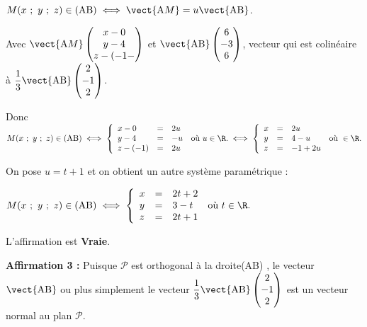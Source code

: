$M(x~;~y~;~z) \in (\text{AB}) \iff \vect{\text{A}M} = u\vect{\text{AB}}$.

Avec $\vect{\text{A}M}\begin{pmatrix}x - 0\\y - 4\\z - (-1-\end{pmatrix}$ et $\vect{\text{AB}}\begin{pmatrix}6\\-3\\6\end{pmatrix}$, vecteur qui est colinéaire à $\dfrac13\vect{\text{AB}}\begin{pmatrix}2\\-1\\2\end{pmatrix}$.

Donc $M(x~;~y~;~z) \in (\text{AB}) \iff \left\{\begin{array}{l c l}
x - 0&=& 2u\\
y - 4&=&  - u\\
z - (-1)&=&2u
\end{array}\right. \:\text{où } u \in \R. \iff \left\{\begin{array}{l c l}
x &=& 2u\\
y &=&4  - u\\
z &=&- 1 + 2u
\end{array}\right. \:\text{où } \in \R.$

On pose $u = t + 1$ et on obtient un autre système paramétrique :

$M(x~;~y~;~z) \in (\text{AB}) \iff \left\{\begin{array}{l c l}
x&=&2t + 2\\y &=& 3 - t\\z&=&2t + 1
\end{array}\right. \:\text{où } t \in \R.$

L'affirmation est \textbf{Vraie}.

\medskip

\textbf{Affirmation 3 :} %
Puisque $\mathcal{P}$ est orthogonal à la droite(AB) , le vecteur $\vect{\text{AB}}$ ou plus simplement le vecteur $\dfrac13\vect{\text{AB}}\begin{pmatrix}2\\-1\\2\end{pmatrix}$ est un vecteur normal au plan $\mathcal{P}$.

